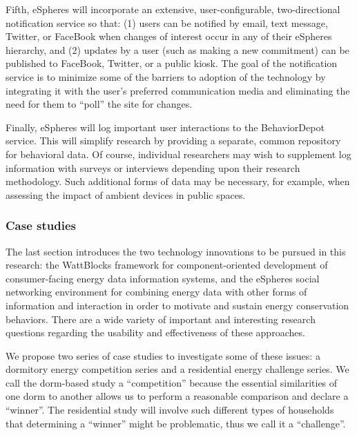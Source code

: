 Fifth, eSpheres will incorporate an extensive, user-configurable,
two-directional notification service so that: (1) users can be notified by
email, text message, Twitter, or FaceBook when changes of interest occur in
any of their eSpheres hierarchy, and (2) updates by a user (such as making
a new commitment) can be published to FaceBook, Twitter, or a public
kiosk. The goal of the notification service is to minimize some of the
barriers to adoption of the technology by integrating it with the user's
preferred communication media and eliminating the need for them to ``poll''
the site for changes.  

Finally, eSpheres will log important user interactions to the BehaviorDepot
service.  This will simplify research by providing a separate, common
repository for behavioral data.  Of course, individual researchers may wish
to supplement log information with surveys or interviews depending upon
their research methodology.  Such additional forms of data may be
necessary, for example, when assessing the impact of ambient devices in
public spaces.

\subsubsection{Case studies}

The last section introduces the two technology innovations to be pursued in
this research: the WattBlocks framework for component-oriented development
of consumer-facing energy data information systems, and the eSpheres social
networking environment for combining energy data with other forms of
information and interaction in order to motivate and sustain energy
conservation behaviors.  There are a wide variety of important and
interesting research questions regarding the usability and effectiveness of
these approaches.  

We propose two series of case studies to investigate some of these issues:
a dormitory energy competition series and a residential energy challenge
series.  We call the dorm-based study a ``competition'' because the
essential similarities of one dorm to another allows us to perform a
reasonable comparison and declare a ``winner''.  The residential study will
involve such different types of households that determining a ``winner''
might be problematic, thus we call it a ``challenge''.  

